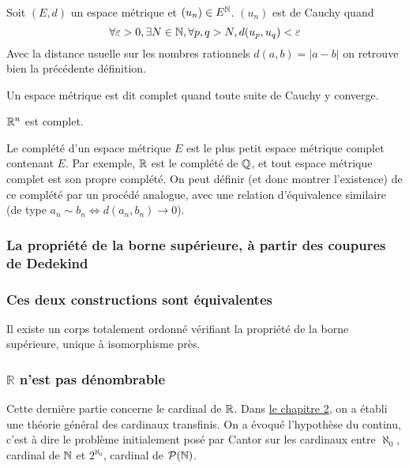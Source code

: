 \begin{defini}
    Soit $(E,d)$ un espace métrique et $(u_n) \in E^{\mathbb{N}}$. $(u_n)$ est de Cauchy quand
    $$\forall \varepsilon > 0, \exists N \in \mathbb{N}, \forall p, q > N, d(u_p, u_q) < \varepsilon$$
    \tcblower
    Avec la distance usuelle sur les nombres rationnels $d(a,b)=|a-b|$ on retrouve bien la précédente définition.
\end{defini}

\begin{defini}
    Un espace métrique est dit complet quand toute suite de Cauchy y converge.
\end{defini}

\begin{ex}
    $\mathbb{R}^n$ est complet.
    \tcblower
\end{ex}

Le complété d'un espace métrique $E$ est le plus petit espace métrique complet contenant $E$. Par exemple, $\mathbb{R}$ est le complété de $\mathbb{Q}$, et tout espace métrique complet est son propre complété.
On peut définir (et donc montrer l'existence) de ce complété par un procédé analogue, avec une relation d'équivalence similaire (de type $a_n \sim b_n \iff d(a_n, b_n) \to 0$). 

\subsubsection{La propriété de la borne supérieure, à partir des coupures de Dedekind}

\subsubsection{Ces deux constructions sont équivalentes}
\begin{theoreme}
    Il existe un corps totalement ordonné vérifiant la propriété de la borne supérieure, unique à isomorphisme près.    
\end{theoreme}

\subsubsection{\texorpdfstring{$\mathbb{R}$}{R} n'est pas dénombrable}
Cette dernière partie concerne le cardinal de $\mathbb{R}$. Dans \hyperref[card]{le chapitre 2}, on a établi une théorie général des cardinaux transfinis. On a évoqué l'hypothèse du continu, c'est à dire le problème initialement posé par Cantor sur les cardinaux entre $\aleph_0$, cardinal de $\mathbb{N}$ et $2^{\aleph_0}$, cardinal de $\mathcal{P}(\mathbb{N})$.

